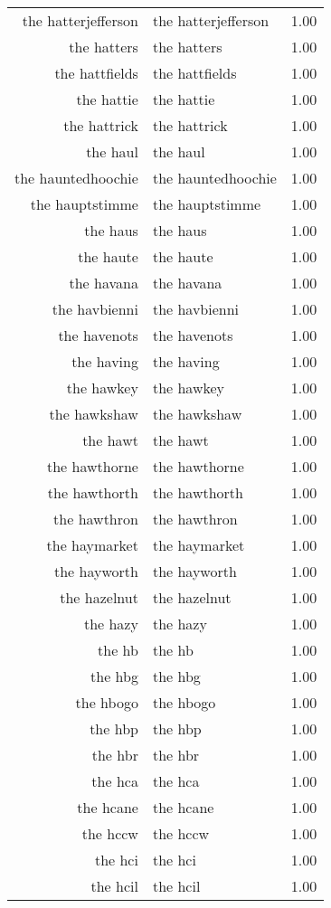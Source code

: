 \begin{table}[ht]
\begin{tabular}{rlr}
  the hatterjefferson & the hatterjefferson & 1.00 \\ 
  the hatters & the hatters & 1.00 \\ 
  the hattfields & the hattfields & 1.00 \\ 
  the hattie & the hattie & 1.00 \\ 
  the hattrick & the hattrick & 1.00 \\ 
  the haul & the haul & 1.00 \\ 
  the hauntedhoochie & the hauntedhoochie & 1.00 \\ 
  the hauptstimme & the hauptstimme & 1.00 \\ 
  the haus & the haus & 1.00 \\ 
  the haute & the haute & 1.00 \\ 
  the havana & the havana & 1.00 \\ 
  the havbienni & the havbienni & 1.00 \\ 
  the havenots & the havenots & 1.00 \\ 
  the having & the having & 1.00 \\ 
  the hawkey & the hawkey & 1.00 \\ 
  the hawkshaw & the hawkshaw & 1.00 \\ 
  the hawt & the hawt & 1.00 \\ 
  the hawthorne & the hawthorne & 1.00 \\ 
  the hawthorth & the hawthorth & 1.00 \\ 
  the hawthron & the hawthron & 1.00 \\ 
  the haymarket & the haymarket & 1.00 \\ 
  the hayworth & the hayworth & 1.00 \\ 
  the hazelnut & the hazelnut & 1.00 \\ 
  the hazy & the hazy & 1.00 \\ 
  the hb & the hb & 1.00 \\ 
  the hbg & the hbg & 1.00 \\ 
  the hbogo & the hbogo & 1.00 \\ 
  the hbp & the hbp & 1.00 \\ 
  the hbr & the hbr & 1.00 \\ 
  the hca & the hca & 1.00 \\ 
  the hcane & the hcane & 1.00 \\ 
  the hccw & the hccw & 1.00 \\ 
  the hci & the hci & 1.00 \\ 
  the hcil & the hcil & 1.00 \\ 

\end{tabular}
\end{table}
